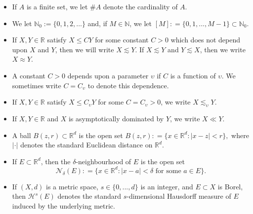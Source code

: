 \documentclass[12pt]{amsart}
\numberwithin{equation}{section}
\begin{document}
\begin{itemize}
\item If $A$ is a finite set, we let $\# A$ denote the cardinality of $A$.

\smallskip

\item We let $\mathbb{N}_0:=\{0,1,2,\ldots\}$ and, if $M \in \mathbb{N}$, we let $[M] : = \{0,1,...,M-1\} \subset \mathbb{N}_0$.

\smallskip

\item If $X,Y \in \mathbb{R}$ satisfy $X \leq CY$ for some constant $C > 0$ which does not depend upon $X$ and $Y$, then we will write $X \lesssim Y$. If $X \lesssim Y$ and $Y \lesssim X$, then we write $X \approx Y$.  

\smallskip

\item A constant $C > 0$ depends upon a parameter $\upsilon$ if $C$ is a function of $\upsilon$. We sometimes write $C = C_{\upsilon}$ to denote this dependence.

\smallskip

\item If $X,Y \in \mathbb{R}$ satisfy $X \leq C_{\upsilon} Y$ for some $C = C_{\upsilon} > 0$, we write $X \lesssim_{\upsilon} Y$.

\smallskip

\item If $X,Y \in \mathbb{R}$ and $X$ is asymptotically dominated by $Y$, we write $X \ll Y$.

\smallskip

\item A ball $B(z,r) \subset \mathbb{R}^d$ is the open set
$
B(z,r) : = \{x \in \mathbb{R}^d : \vert x - z\vert < r\},
$
where $\lvert \cdot \rvert$ denotes the standard Euclidean distance on $\mathbb{R}^d$.
\smallskip

\item If $E \subset \mathbb{R}^d$, then the $\delta$-neighbourhood of $E$ is the open set $$
\mathcal{N}_{\delta} (E) : = \{x \in \mathbb{R}^d : \vert x - a \vert < \delta \textrm{ for some } a \in E\}.
$$

\smallskip

\item If $(X,d)$ is a metric space, $s \in \{0,...,d\}$ is an integer, and $E \subset X$ is Borel, then $\mathcal{H}^s (E)$ denotes the standard $s$-dimensional Hausdorff measure of $E$ induced by the underlying metric. 

\end{itemize}
\end{document}
